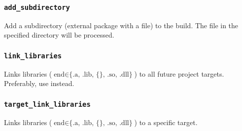 \subsubsection{\texttt{add\_subdirectory}}
\begin{center}  \end{center}
Add a subdirectory (external package with a  file) to the build. The  file in the specified directory will be processed.

\subsubsection{\texttt{link\_libraries}}
\begin{center}  \end{center}
Links libraries ($\text{end} \in \text{\{.a, .lib, \{\}, .so, .dll\}}$) to all future project targets. Preferably, use  instead. 

\subsubsection{\texttt{target\_link\_libraries}}
\begin{center}  \end{center}
Links libraries ($\text{end} \in \text{\{.a, .lib, \{\}, .so, .dll\}}$) to a specific target.